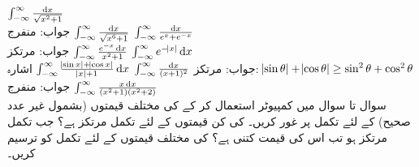 $\int_{-\infty}^{\infty}\frac{\dif x}{\sqrt{x^2+1}}$\\
جواب:\quad
منفرج
$\int_{-\infty}^{\infty}\frac{\dif x}{\sqrt{x^6+1}}$
$\int_{-\infty}^{\infty}\frac{\dif x}{e^x+e^{-x}}$\\
جواب:\quad
مرتکز
$\int_{-\infty}^{\infty}\frac{e^{-x}\dif x}{x^2+1}$
$\int_{-\infty}^{\infty}e^{-\abs{x}}\dif x$\\
جواب:\quad
مرتکز
$\int_{-\infty}^{\infty}\frac{\dif x}{(x+1)^2}$
$\int_{-\infty}^{\infty}\frac{\abs{\sin x}+\abs{\cos x}}{\abs{x}+1}\dif x$\quad
اشارہ: 
$\abs{\sin \theta}+\abs{\cos\theta}\ge \sin^2\theta+\cos^2\theta$\\
جواب:\quad
منفرج
$\int_{-\infty}^{\infty}\frac{x\dif x}{(x^2+1)(x^2+2)}$
\\
سوال  تا سوال  میں کمپیوٹر استعمال کر کے  کی مختلف قیمتوں (بشمول غیر عدد صحیح) کے لئے تکمل پر غور کریں۔  کی کن قیمتوں کے لئے تکمل مرتکز ہے؟ جب تکمل مرتکز ہو تب اس کی قیمت کتنی ہے؟  کی مختلف قیمتوں کے لئے تکمل کو ترسیم کریں۔

